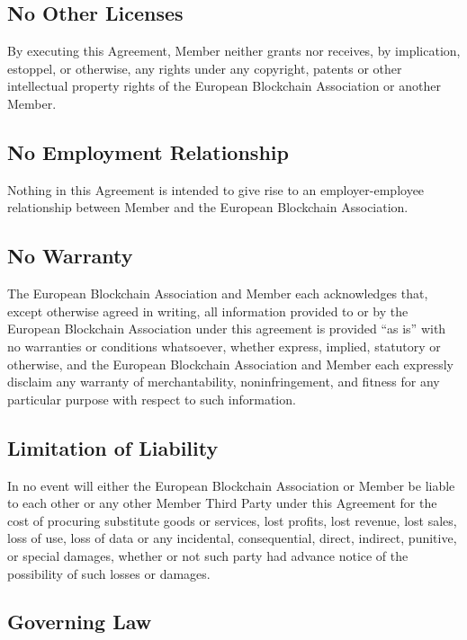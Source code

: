 \documentclass{article}
\begin{document}
\subsection{No Other Licenses}

By executing this Agreement, Member neither grants nor receives, by implication, estoppel, or otherwise, any rights under any copyright, patents or other intellectual property rights of the European Blockchain Association or another Member.

\subsection{No Employment Relationship}

Nothing in this Agreement is intended to give rise to an employer-employee relationship between Member and the European Blockchain Association.

\subsection{No Warranty}

The European Blockchain Association and Member each acknowledges that,  except otherwise agreed in writing, all information provided to or by the European Blockchain Association under this agreement is provided “as is” with no warranties or conditions whatsoever, whether express, implied, statutory or otherwise, and the European Blockchain Association and Member each expressly disclaim any warranty of merchantability, noninfringement, and fitness for any particular purpose with respect to such information. 

\subsection{Limitation of Liability}

In no event will either the European Blockchain Association or Member be liable to each other or any other Member Third Party under this Agreement for the cost of procuring substitute goods or services, lost profits, lost revenue, lost sales, loss of use, loss of data or any incidental, consequential, direct, indirect, punitive, or special damages, whether or not such party had advance notice of the possibility of such losses or damages.

\subsection{Governing Law}
\end{document}
